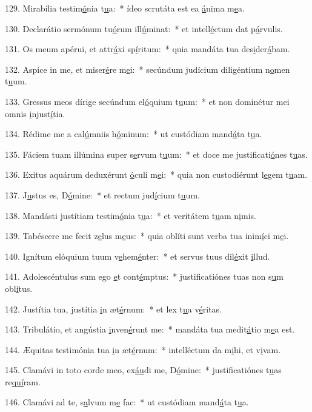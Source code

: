 129. Mirabília testim\uline{ó}nia t\uline{u}a:~* ídeo scrutáta est ea \uline{á}nima m\uline{e}a.\par 
130. Declarátio sermónum tu\uline{ó}rum ill\uline{ú}minat:~* et intell\uline{é}ctum dat p\uline{á}rvulis.\par 
131. Os meum apérui, et attr\uline{á}xi sp\uline{í}ritum:~* quia mandáta tua des\uline{i}der\uline{á}bam.\par 
132. Aspice in me, et miser\uline{é}re m\uline{e}i:~* secúndum judícium diligéntium n\uline{o}men t\uline{u}um.\par 
133. Gressus meos dírige secúndum el\uline{ó}quium t\uline{u}um:~* et non dominétur mei omnis \uline{i}njust\uline{í}tia.\par 
134. Rédime me a cal\uline{ú}mniis h\uline{ó}minum:~* ut custódiam mand\uline{á}ta t\uline{u}a.\par 
135. Fáciem tuam illúmina super s\uline{e}rvum t\uline{u}um:~* et doce me justificati\uline{ó}nes t\uline{u}as.\par 
136. Exitus aquárum deduxérunt \uline{ó}culi m\uline{e}i:~* quia non custodiérunt l\uline{e}gem t\uline{u}am.\par 
137. J\uline{u}stus es, D\uline{ó}mine:~* et rectum jud\uline{í}cium t\uline{u}um.\par 
138. Mandásti justítiam testim\uline{ó}nia t\uline{u}a:~* et veritátem t\uline{u}am n\uline{i}mis.\par 
139. Tabéscere me fecit z\uline{e}lus m\uline{e}us:~* quia oblíti sunt verba tua inim\uline{í}ci m\uline{e}i.\par 
140. Ignítum elóquium tuum v\uline{e}hem\uline{é}nter:~* et servus tuus dil\uline{é}xit \uline{i}llud.\par 
141. Adolescéntulus sum ego \uline{e}t cont\uline{é}mptus:~* justificatiónes tuas non s\uline{u}m obl\uline{í}tus.\par 
142. Justítia tua, justítia \uline{i}n æt\uline{é}rnum:~* et lex t\uline{u}a v\uline{é}ritas.\par 
143. Tribulátio, et angústia \uline{i}nven\uline{é}runt me:~* mandáta tua medit\uline{á}tio m\uline{e}a est.\par 
144. Æquitas testimónia tua \uline{i}n æt\uline{é}rnum:~* intelléctum da m\uline{i}hi, et v\uline{i}vam.\par 
145. Clamávi in toto corde meo, ex\uline{áu}di me, D\uline{ó}mine:~* justificatiónes t\uline{u}as re\uline{quí}ram.\par 
146. Clamávi ad te, s\uline{a}lvum m\uline{e} fac:~* ut custódiam mand\uline{á}ta t\uline{u}a.\par 
